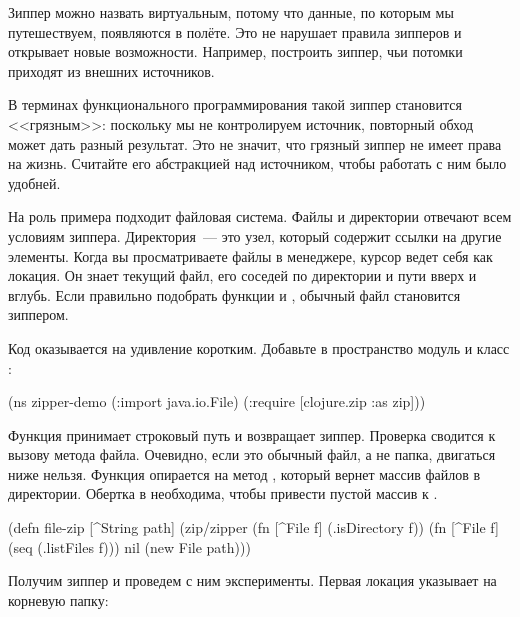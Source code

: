 Зиппер можно назвать виртуальным, потому что данные, по которым мы путешествуем,
появляются в полёте. Это не нарушает правила зипперов и открывает новые
возможности. Например, построить зиппер, чьи потомки приходят из внешних
источников.

В терминах функционального программирования такой зиппер становится <<грязным>>:
поскольку мы не контролируем источник, повторный обход может дать разный
результат. Это не значит, что грязный зиппер не имеет права на жизнь. Считайте
его абстракцией над источником, чтобы работать с ним было удобней.


На роль примера подходит файловая система. Файлы и директории отвечают всем
условиям зиппера. Директория~--- это узел, который содержит ссылки на другие
элементы. Когда вы просматриваете файлы в менеджере, курсор ведет себя как
локация. Он знает текущий файл, его соседей по директории и пути вверх и
вглубь. Если правильно подобрать функции  и ,
обычный файл становится зиппером.

Код оказывается на удивление коротким. Добавьте в пространство модуль
 и класс :


\begin{english}
  \begin{clojure}
(ns zipper-demo
  (:import java.io.File)
  (:require
   [clojure.zip :as zip]))
  \end{clojure}
\end{english}

Функция  принимает строковый путь и возвращает зиппер. Проверка
 сводится к вызову метода  файла. Очевидно, если это
обычный файл, а не папка, двигаться ниже нельзя. Функция  опирается на
метод , который вернет массив файлов в директории. Обертка в 
необходима, чтобы привести пустой массив к .

\begin{english}
  \begin{clojure}
(defn file-zip [^String path]
  (zip/zipper
   (fn [^File f] (.isDirectory f))
   (fn [^File f] (seq (.listFiles f)))
   nil
   (new File path)))
  \end{clojure}
\end{english}

Получим зиппер и проведем с ним эксперименты. Первая локация указывает на
корневую папку:

